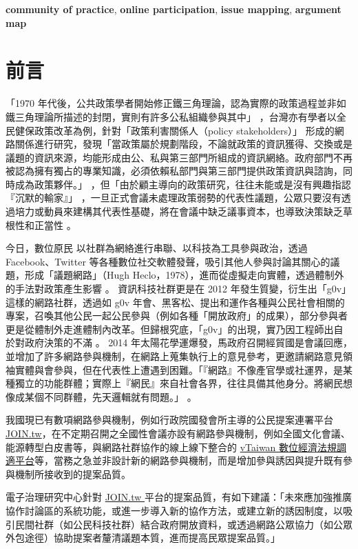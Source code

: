 \documentclass[12pt,a4paper]{article}
\begin{document}
\textbf{community of practice}, \textbf{online participation}, \textbf{issue mapping}, \textbf{argument map}
\section{前言}
\label{sec:orgad82d66}
「1970 年代後，公共政策學者開始修正鐵三角理論，認為實際的政策過程並非如鐵三角理論所描述的封閉，實則有許多公私組織參與其中」 \citep*{luo15_gong} ，台灣亦有學者以全民健保政策改革為例，針對「政策利害關係人（policy stakeholders）」\citep{dunn94_public} 形成的網路關係進行研究，發現「當政策屬於規劃階段，不論就政策的資訊獲得、交換或是議題的資訊來源，均能形成由公、私與第三部門所組成的資訊網絡。政府部門不再被認為擁有獨占的專業知識，必須依賴私部門與第三部門提供政策資訊與諮詢，同時成為政策夥伴。」\citep{luo2005} ，但「由於顧主導向的政策研究，往往未能或是沒有興趣指認『沉默的輸家』」\citep*{chen11} ，一旦正式會議未處理政策弱勢的代表性議題，公眾只要沒有透過培力或動員來建構其代表性基礎，將在會議中缺乏議事資本，也導致決策缺乏草根性和正當性 \citep*{lo17}。

今日，數位原民 \citep*{prensky2001digital} 以社群為網絡進行串聯、以科技為工具參與政治，透過 Facebook、Twitter 等各種數位社交軟體發聲，吸引其他人參與討論其關心的議題，形成「議題網路」（Hugh Heclo，1978），進而從虛擬走向實體，透過體制外的手法對政策產生影響 \citep*{xue11_xiang} 。 資訊科技社群更是在 2012 年發生質變，衍生出「g0v」這樣的網路社群，透過如 g0v 年會、黑客松、提出和運作各種與公民社會相關的專案，召喚其他公民一起公民參與（例如各種「開放政府」的成果），部分參與者更是從體制外走進體制內改革。但歸根究底，「g0v」的出現，實乃因工程師出自於對政府決策的不滿 \citep*{zheng18} 。 2014 年太陽花學運爆發，馬政府召開經貿國是會議回應，並增加了許多網路參與機制，在網路上蒐集執行上的意見參考，更邀請網路意見領袖實體與會參與，但在代表性上遭遇到困難。「『網路』不像產官學或社運界，是某種獨立的功能群體；實際上『網民』來自社會各界，往往具備其他身分。將網民想像成某個不同群體，先天邏輯就有問題。」\citep*{albert2014} 。

我國現已有數項網路參與機制，例如行政院國發會所主導的公民提案連署平台 \href{https://join.gov.tw}{JOIN.tw}，在不定期召開之全國性會議亦設有網路參與機制，例如全國文化會議、能源轉型白皮書等，與網路社群協作的線上線下整合的 \href{https://vtaiwan.tw/}{vTaiwan 數位經濟法規調適平台}等，當務之急並非設計新的網路參與機制，而是增加參與誘因與提升既有參與機制所接收到的提案品質。

電子治理研究中心針對 \href{https://join.gov.tw}{JOIN.tw }平台的提案品質，有如下建議：「未來應加強推廣協作討論區的系統功能，或進一步導入新的協作方法，或建立新的誘因制度，以吸引民間社群（如公民科技社群）結合政府開放資料，或透過網路公眾協力（如公眾外包途徑）協助提案者釐清議題本質，進而提高民眾提案品質。」\citep{liao18}
\end{document}
